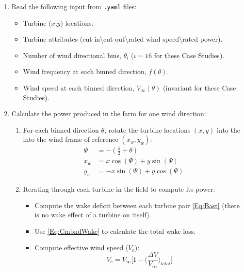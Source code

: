 \documentclass[10pt]{article}
\begin{document}
    \begin{enumerate}
        \item Read the following input from \texttt{.yaml} files:
            \begin{itemize}
                \item Turbine ($x$,$y$) locations.
                \item Turbine attributes (cut-in\textbackslash cut-out\textbackslash rated wind speed\textbackslash rated power).
                \item Number of wind directional bins, $\theta_{i}$ ($i=16$ for these Case Studies).
                \item Wind frequency at each binned direction, $f(\theta)$.
                \item Wind speed at each binned direction, $V_{\infty}(\theta)$ (invariant for these Case Studies).
            \end{itemize}
        \item Calculate the power produced in the farm for one wind direction:
            \begin{enumerate}
                \item For each binned direction $\theta$, rotate the turbine locations $(x,y)$ into the into the wind frame of reference $(x_w, y_w)$:
                \begin{align*}
                    \Psi &= -\left(\frac{\pi}{2} + \theta\right) \\
                    x_w &= x\cos(\Psi) + y\sin(\Psi)\\
                    y_w &= -x\sin(\Psi) + y\cos(\Psi)
                \end{align*}
                \item Iterating through each turbine in the field to compute its power:
                    \begin{itemize}
                        \item Compute the wake deficit between each turbine pair \cref{Eq:Bast} (there is no wake effect of a turbine on itself).
                        \item Use \cref{Eq:CmbndWake} to calculate the total wake loss.
                        \item Compute effective wind speed ($V_{e}$):
                            \begin{equation*}
                                V_{e} = V_{\infty} \bigg[1 - \bigg(\frac{\Delta V}{V_{\infty}}\bigg)_{total}\bigg]
                            \end{equation*}

\end{itemize}
\end{enumerate}
\end{enumerate}
\end{document}
